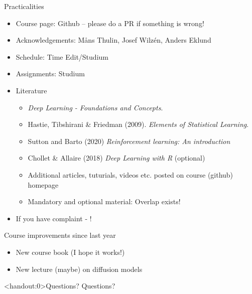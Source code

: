 \documentclass[10pt]{beamer}
\begin{document}
\begin{frame}{Practicalities}

\begin{itemize}
\item Course page: Github -- please do a PR if something is wrong!\pause
\item Acknowledgements: M{\aa}ns Thulin, Josef Wilzén, Anders Eklund\pause
\item Schedule: Time Edit/Studium
\item Assignments: Studium\pause
\item Literature
\begin{itemize}
\item {} \emph{Deep Learning - Foundations and Concepts}.
\item Hastie, Tibshirani \& Friedman (2009). \emph{Elements of Statistical Learning}.
\item Sutton and Barto (2020) \emph{Reinforcement learning: An introduction}
\item Chollet \& Allaire (2018) \emph{Deep Learning with R} (optional)
\item Additional articles, tuturials, videos etc. posted on course (github) homepage
\item Mandatory and optional material: Overlap exists!
\end{itemize}
\pause
\item If you have complaint - !
\end{itemize}

\end{frame}



\begin{frame}{Course improvements since last year}

\begin{itemize}
\item New course book (I hope it works!)
\item New lecture (maybe) on diffusion models
\end{itemize}

\end{frame}

\begin{frame}<handout:0>{Questions?}
Questions?
\end{frame}

\end{document}
